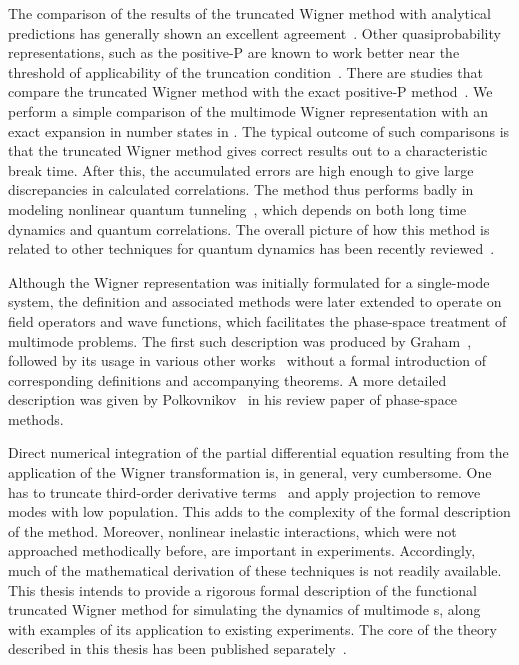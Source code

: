 The comparison of the results of the truncated Wigner method with analytical predictions has generally shown an excellent agreement~\cite{Corney2006,Deuar2007}.
Other quasiprobability representations, such as the positive-P are known to work better near the threshold of applicability of the truncation condition~\cite{Deuar2007,Hoffmann2008}.
There are studies that compare the truncated Wigner method with the exact positive-P method~\cite{Drummond1993,Chaturvedi2002,Dechoum2004}.
We perform a simple comparison of the multimode Wigner representation with an exact expansion in number states in .
The typical outcome of such comparisons is that the truncated Wigner method gives correct results out to a characteristic break time.
After this, the accumulated errors are high enough to give large discrepancies in calculated correlations.
The method thus performs badly in modeling nonlinear quantum tunneling~\cite{Drummond1989,Kinsler1991a}, which depends on both long time dynamics and quantum correlations.
The overall picture of how this method is related to other techniques for quantum dynamics has been recently reviewed~\cite{He2012}.

Although the Wigner representation was initially formulated for a single-mode system, the definition and associated methods were later extended to operate on field operators and wave functions, which facilitates the phase-space treatment of multimode problems.
The first such description was produced by Graham~\cite{Graham1970,Graham1970a}, followed by its usage in various other works~\cite{Steel1998,Gardiner2003,Isella2006,Norrie2006,Norrie2006a,Blakie2008,Martin2010} without a formal introduction of corresponding definitions and accompanying theorems.
A more detailed description was given by Polkovnikov~\cite{Polkovnikov2010} in his review paper of phase-space methods.

Direct numerical integration of the partial differential equation resulting from the application of the Wigner transformation is, in general, very cumbersome.
One has to truncate third-order derivative terms~\cite{Drummond1993,Steel1998,Sinatra2002} and apply projection to remove modes with low population.
This adds to the complexity of the formal description of the method.
Moreover, nonlinear inelastic interactions, which were not approached methodically before, are important in  experiments.
Accordingly, much of the mathematical derivation of these techniques is not readily available.
This thesis intends to provide a rigorous formal description of the functional truncated Wigner method for simulating the dynamics of multimode s, along with examples of its application to existing experiments.
The core of the theory described in this thesis has been published separately~\cite{Opanchuk2013}.


